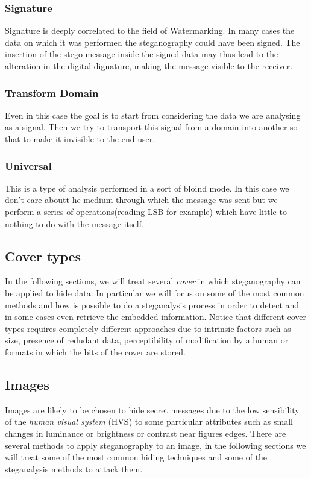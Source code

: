 \documentclass[../../main.tex]{subfiles}
\begin{document}
    \subsubsection{Signature}
    Signature is deeply correlated to the field of Watermarking. In many cases the data on which it was performed the steganography could have been signed.
    The insertion of the stego message inside the signed data may thus lead to the alteration in the digital dignature, making the message visible 
    to the receiver.
    
    \subsubsection{Transform Domain}
    Even in this case the goal is to start from considering the data we are analysing as a signal. Then we try to transport this signal from a domain into another 
    so that to make it invisible to the end user.
    
    \subsubsection{Universal}
    This is a type of analysis performed in a sort of bloind mode. In this case we don't care aboutt he medium through which the message was sent but we perform a series of 
    operations(reading LSB for example) which have little to nothing to do with the message itself.

    \subsection{Cover types}
    In the following sections, we will treat several \emph{cover} in which
    steganography can be applied to hide data.
    In particular we will focus on some of the most common methods and how is
    possible to do a steganalysis process in order to detect and in some cases
    even retrieve the embedded information.
    Notice that different cover types requires completely different approaches
    due to intrinsic factors such as size, presence of redudant data,
    perceptibility of modification by a human or formats in which the bits of
    the cover are stored.


    \subsection{Images}
    Images are likely to be chosen to hide secret messages due to the low
    sensibility of the \emph{human visual system} (HVS) to some particular
    attributes such as small changes in luminance or brightness or contrast near
    figures edges.
    There are several methods to apply steganography to an image, in the
    following sections we will treat some of the most common hiding techniques
    and some of the steganalysis methods to attack them.
\end{document}
